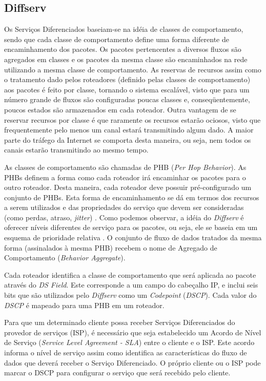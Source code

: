 \subsection{Diffserv}	

	Os Serviços Diferenciados \cite{BBCDWW98} baseiam-se na idéia de classes de comportamento, sendo que cada classe de comportamento define uma forma diferente de encaminhamento dos pacotes. Os pacotes pertencentes a diversos fluxos são agregados em classes e os pacotes da mesma classe são encaminhados na rede utilizando a mesma classe de comportamento. As reservas de recursos assim como o tratamento dado pelos roteadores (definido pelas classes de comportamento) aos pacotes é feito por classe, tornando o sistema escalável, visto que para um número grande de fluxos são configuradas poucas classes e, conseqüentemente, poucos estados são armazenados em cada roteador. Outra vantagem de se reservar recursos por classe é que raramente os recursos estarão ociosos, visto que frequentemente pelo menos um canal estará transmitindo algum dado. A maior parte do tráfego da Internet se comporta desta maneira, ou seja, nem todos os canais estarão transmitindo ao mesmo tempo.
	
	As classes de comportamento são chamadas de PHB (\textit{Per Hop Behavior}). As PHBs definem a forma como cada roteador irá encaminhar os pacotes para o outro roteador. Desta maneira, cada roteador deve possuir pré-configurado um conjunto de PHBs. Esta forma de encaminhamento se dá em termos dos recursos a serem utilizados e das propriedades do serviço que devem ser consideradas (como perdas, atraso, \textit{jitter}) \cite{GORENDER05}. Como podemos observar, a idéia do \textit{Diffserv} é oferecer níveis diferentes de serviço para os pacotes, ou seja, ele se baseia em um esquema de prioridade relativa \cite{XINI99}. O conjunto de fluxo de dados tratados da mesma forma (assinalados à mesma PHB) recebem o nome de Agregado de Comportamento (\textit{Behavior Aggregate}).
	
	Cada roteador identifica a classe de comportamento que será aplicada ao pacote através do \textit{DS Field}. Este corresponde a um campo do cabeçalho IP, e inclui seis bits que são utilizados pelo \textit{Diffserv} como um \textit{Codepoint} (\textit{DSCP}). Cada valor do \textit{DSCP} é mapeado para uma PHB em um roteador.

	Para que um determinado cliente possa receber Serviços Diferenciados do provedor de serviços (ISP), é necessário que seja estabelecido um Acordo de Ní­vel de Serviço (\textit{Service Level Agreement - SLA}) entre o cliente e o ISP. Este acordo informa o ní­vel de serviço assim como identifica as características do fluxo de dados que deverá receber o Serviço Diferenciado. O próprio cliente ou o ISP pode marcar o DSCP para configurar o serviço que será recebido pelo cliente.
	
